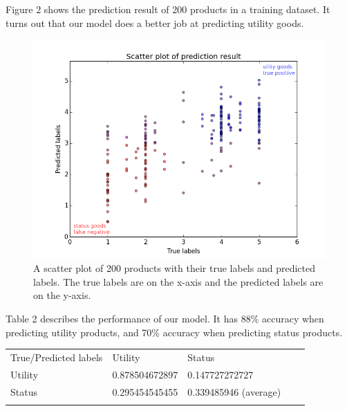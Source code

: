 \documentclass[dvips,12pt]{article}
\begin{document}
Figure 2 shows the prediction result of 200 products in a training dataset. It turns out that our model does a better job at predicting utility goods.

\begin{figure}[h] \label{scatterplot}
	\includegraphics[scale=0.6]{scatter}
	\centering
	\caption{A scatter plot of 200 products with their true labels and predicted labels. The true labels are on the x-axis and the predicted labels are on the y-axis.}
\end{figure}

Table 2 describes the performance of our model. It has 88\% accuracy when predicting utility products, and 70\% accuracy when predicting status products.

\begin{table}[] \label{fpr}
	\centering
	\label{my-label}
	\begin{tabular}{lllll}
		\cline{1-3}
		\multicolumn{1}{|l|}{True/Predicted labels} & \multicolumn{1}{l|}{Utility}        & \multicolumn{1}{l|}{Status}                &  &  \\ \cline{1-3}
		\multicolumn{1}{|l|}{Utility}               & \multicolumn{1}{l|}{0.878504672897} & \multicolumn{1}{l|}{0.147727272727}        &  &  \\ \cline{1-3}
		\multicolumn{1}{|l|}{Status}                & \multicolumn{1}{l|}{0.295454545455} & \multicolumn{1}{l|}{0.339485946 (average)} &  &  \\ \cline{1-3}
		&                                     &                                            &  & 
	\end{tabular}
\end{table}
\end{document}
